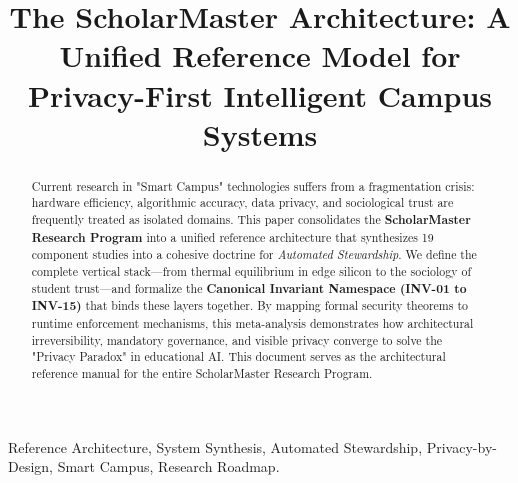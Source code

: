 \documentclass[conference]{IEEEtran}
\theoremstyle{definition}
\begin{document}
\title{The ScholarMaster Architecture: A Unified Reference Model for Privacy-First Intelligent Campus Systems}

\author{
}

\maketitle

\begin{abstract}
Current research in "Smart Campus" technologies suffers from a fragmentation crisis: hardware efficiency, algorithmic accuracy, data privacy, and sociological trust are frequently treated as isolated domains. This paper consolidates the \textbf{ScholarMaster Research Program} into a unified reference architecture that synthesizes 19 component studies into a cohesive doctrine for \textit{Automated Stewardship}. We define the complete vertical stack—from thermal equilibrium in edge silicon to the sociology of student trust—and formalize the \textbf{Canonical Invariant Namespace (INV-01 to INV-15)} that binds these layers together. By mapping formal security theorems to runtime enforcement mechanisms, this meta-analysis demonstrates how architectural irreversibility, mandatory governance, and visible privacy converge to solve the "Privacy Paradox" in educational AI. This document serves as the architectural reference manual for the entire ScholarMaster Research Program.
\end{abstract}

\begin{IEEEkeywords}
Reference Architecture, System Synthesis, Automated Stewardship, Privacy-by-Design, Smart Campus, Research Roadmap.
\end{IEEEkeywords}

\end{document}
